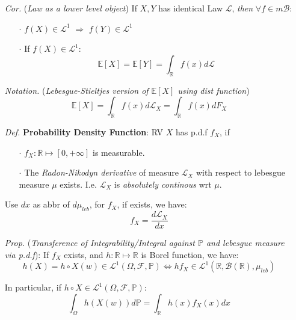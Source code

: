 \documentclass[a4paper,12pt,twoside]{book}
\begin{document}
\begin{itemize}
	\item[\textit{Cor.}] (\textit{Law as a lower level object}) If $X,Y$ has identical Law $\mathcal{L}$, \textit{then} $\forall f\in m\mathscr{B}$:
	\begin{itemize}
		\item[$\cdot$] $f(X) \in \mathcal{L}^1$ $\Rightarrow$ $f(Y)\in \mathcal{L}^1$
		\item[$\cdot$] If $f(X)\in \mathcal{L}^1$:
		\begin{equation}
			\mathbb{E}\left[X\right]=\mathbb{E}\left[Y\right]=\int_{\mathbb{R}}f(x)d \mathcal{L}
		\end{equation}
	\end{itemize}

	\item[\textit{Notation.}] (\textit{Lebesgue-Stieltjes version of $\mathbb{E}\left[X\right]$ using dist function})
	\begin{equation}
		\mathbb{E}\left[X\right]=\int_{\mathbb{R}}f(x)d \mathcal{L}_X=\int_{\mathbb{R}}f(x)d F_X
	\end{equation}

	\item[\textit{Def.}] \textbf{Probability Density Function}: RV $X$ has p.d.f $f_X$, if
	\begin{itemize}
		\item[$\cdot$] $f_X: \mathbb{R}\mapsto [0,+\infty]$ is measurable.
		\item[$\cdot$] The \textit{Radon-Nikodyn derivative} of measure $\mathcal{L}_X$ with respect to lebesgue measure $\mu$ exists. I.e. $\mathcal{L}_X$ is \textit{absolutely continous} wrt $\mu$.
	\end{itemize}
	Use $dx$ as abbr of $d\mu_{leb}$, for $f_X$, if exists, we have: 
	\begin{equation}
		f_X = \frac{d \mathcal{L}_X}{dx}
	\end{equation}

	\item[\textit{Prop.}] (\textit{Transference of Integrability/Integral against $\mathbb{P}$ and lebesgue measure via p.d.f}): If $f_X$ exists, and $h: \mathbb{R}\mapsto \mathbb{R}$ is Borel function, we have:
	$$h(X)=h\circ X(w)\in \mathcal{L}^1 (\Omega, \mathcal{F}, \mathbb{P}) \iff hf_X \in \mathcal{L}^1(\mathbb{R}, \mathscr{B}(\mathbb{R}), \mu_{leb})$$

	In particular, if $h\circ X\in \mathcal{L}^1 (\Omega, \mathcal{F}, \mathbb{P})$:
	\begin{equation}
		\int_{\Omega}h(X(w))d \mathbb{P}=\int_{\mathbb{R}}h(x)f_X(x)dx
	\end{equation}


\end{itemize}
\end{document}
